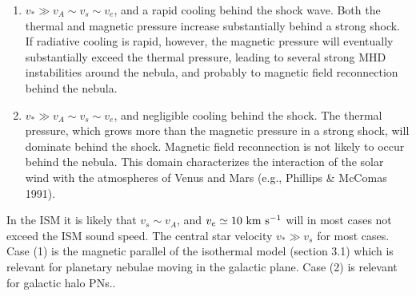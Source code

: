 \begin{enumerate}
\item $v_\ast \gg v_A \sim v_s \sim v_e$, and a rapid cooling behind the
shock wave.
Both the thermal and magnetic pressure increase substantially behind
a strong shock. If radiative cooling is rapid, however, the magnetic pressure
will eventually substantially exceed the thermal pressure, leading to
several strong MHD instabilities around the nebula, and probably to
magnetic field reconnection behind the nebula.

\item $v_\ast \gg v_A \sim v_s \sim v_e$, and negligible cooling behind the
shock. The thermal pressure, which grows more than the magnetic pressure in a
strong shock, will dominate behind the shock. 
Magnetic field reconnection is not likely to occur behind the nebula.
This domain characterizes the interaction of the solar wind with
the atmospheres of Venus and Mars (e.g., Phillips \& McComas 1991).
\end{enumerate}

In the ISM it is likely that $v_s \sim v_A$, and
$v_e \simeq 10 ~\rm{km} ~\rm{s}^{-1}$ will in most cases not exceed the ISM sound speed.
The central star velocity $v_\ast \gg v_s$ for most cases.
Case (1) is the magnetic parallel of the isothermal model (section 3.1)
which is relevant for planetary nebulae moving in the galactic plane.
Case (2) is relevant for galactic halo PNs..

